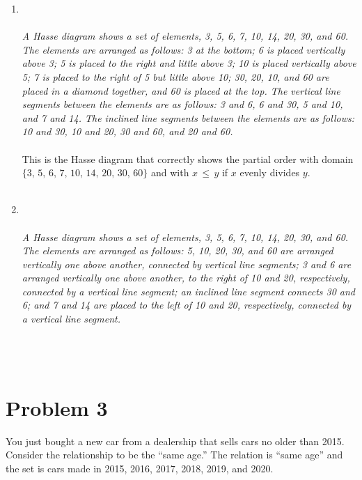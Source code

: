 \documentclass{amsart}
\theoremstyle{definition}
\theoremstyle{Exercise}
\theoremstyle{remark}
\theoremstyle{rule}
\numberwithin{equation}{section}
\begin{document}
\begin{enumerate}[label=(\roman*)]
\newpage
\item
{}
\\\\
{\color{blue}{\bf Figure 4:} \emph{A Hasse diagram shows a set of elements, 3, 5, 6, 7, 10, 14, 20, 30, and 60. The elements are arranged as follows: 3 at the bottom; 6 is placed vertically above 3; 5 is placed to the right and little above 3; 10 is placed vertically above 5; 7 is placed to the right of 5 but little above 10; 30, 20, 10, and 60 are placed in a diamond together, and 60 is placed at the top. The vertical line segments between the elements are as follows: 3 and 6, 6 and 30, 5 and 10, and 7 and 14. The inclined line segments between the elements are as follows: 10 and 30, 10 and 20, 30 and 60, and 20 and 60.
}
}
\\
\\
  This is the Hasse diagram that correctly shows the partial order with domain $\{3,\, 5,\, 6, \,7,\, 10,\, 14,\, 20,\, 30,\,60\}$ and with $x\,\leq \,y$ if $x$ evenly divides $y$.
\\\\
\newpage
\item
{}
\\\\
{\color{blue}{\bf Figure 5:} \emph{A Hasse diagram shows a set of elements, 3, 5, 6, 7, 10, 14, 20, 30, and 60. The elements are arranged as follows: 5, 10, 20, 30, and 60 are arranged vertically one above another, connected by vertical line segments; 3 and 6 are arranged vertically one above another, to the right of 10 and 20, respectively, connected by a vertical line segment; an inclined line segment connects 30 and 6; and 7 and 14 are placed to the left of 10 and 20, respectively, connected by a vertical line segment.
}
}
\\\\
\\\\

\end{enumerate}
  \newpage
  \section*{Problem 3}
  You just bought a new car from a dealership that sells cars no older than 2015. Consider the relationship to be the ``same age.'' The relation is ``same age'' and the set is cars made in 2015, 2016, 2017, 2018, 2019, and 2020.
\end{document}
